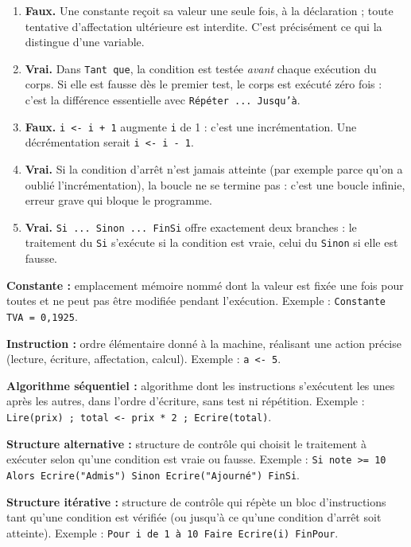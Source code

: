 \documentclass[11pt]{article}
\newcommand{\cle}[1]{{\popxbold\color{popdark}#1}}
\begin{document}
\begin{corrige}
\begin{enumerate}
  \item \textbf{Faux.} Une constante reçoit sa valeur une seule fois, à la déclaration ; toute tentative d'affectation ultérieure est interdite. C'est précisément ce qui la distingue d'une variable.
  \item \textbf{Vrai.} Dans \texttt{Tant que}, la condition est testée \emph{avant} chaque exécution du corps. Si elle est fausse dès le premier test, le corps est exécuté zéro fois : c'est la différence essentielle avec \texttt{Répéter ... Jusqu'à}.
  \item \textbf{Faux.} \texttt{i <- i + 1} augmente \texttt{i} de 1 : c'est une \cle{incrémentation}. Une décrémentation serait \texttt{i <- i - 1}.
  \item \textbf{Vrai.} Si la condition d'arrêt n'est jamais atteinte (par exemple parce qu'on a oublié l'incrémentation), la boucle ne se termine pas : c'est une \cle{boucle infinie}, erreur grave qui bloque le programme.
  \item \textbf{Vrai.} \texttt{Si ... Sinon ... FinSi} offre exactement deux branches : le traitement du \texttt{Si} s'exécute si la condition est vraie, celui du \texttt{Sinon} si elle est fausse.
\end{enumerate}
\end{corrige}

\begin{corrige}
\textbf{Constante :} emplacement mémoire nommé dont la valeur est fixée une fois pour toutes et ne peut pas être modifiée pendant l'exécution. Exemple : \texttt{Constante TVA = 0,1925}.

\textbf{Instruction :} ordre élémentaire donné à la machine, réalisant une action précise (lecture, écriture, affectation, calcul). Exemple : \texttt{a <- 5}.

\textbf{Algorithme séquentiel :} algorithme dont les instructions s'exécutent les unes après les autres, dans l'ordre d'écriture, sans test ni répétition. Exemple : \texttt{Lire(prix) ; total <- prix * 2 ; Ecrire(total)}.

\textbf{Structure alternative :} structure de contrôle qui choisit le traitement à exécuter selon qu'une condition est vraie ou fausse. Exemple : \texttt{Si note >= 10 Alors Ecrire("Admis") Sinon Ecrire("Ajourné") FinSi}.

\textbf{Structure itérative :} structure de contrôle qui répète un bloc d'instructions tant qu'une condition est vérifiée (ou jusqu'à ce qu'une condition d'arrêt soit atteinte). Exemple : \texttt{Pour i de 1 à 10 Faire Ecrire(i) FinPour}.
\end{corrige}
\end{document}
